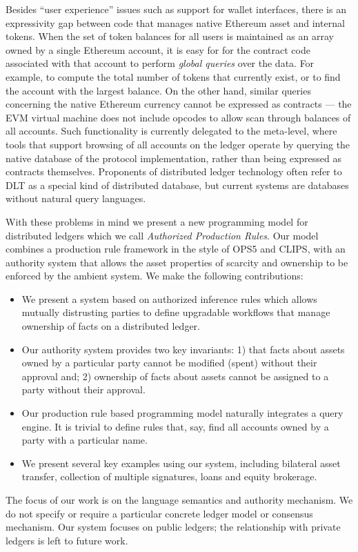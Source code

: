 Besides ``user experience'' issues such as support for wallet interfaces, there is an expressivity gap between code that manages native Ethereum asset and internal tokens. When the set of token balances for all users is maintained as an array owned by a single Ethereum account, it is easy for for the contract code associated with that account to perform \emph{global queries} over the data. For example, to compute the total number of tokens that currently exist, or to find the account with the largest balance. On the other hand, similar queries concerning the native Ethereum currency cannot be expressed as contracts --- the EVM virtual machine does not include opcodes to allow scan through balances of all accounts. Such functionality is currently delegated to the meta-level, where tools that support browsing of all accounts on the ledger operate by querying the native database of the protocol implementation, rather than being expressed as contracts themselves. Proponents of distributed ledger technology often refer to DLT as a special kind of distributed database, but current systems are databases without natural query languages.

With these problems in mind we present a new programming model for distributed ledgers which we call \emph{Authorized Production Rules}. Our model combines a production rule framework in the style of OPS5 and CLIPS, with an authority system that allows the asset properties of scarcity and ownership to be enforced by the ambient system. We make the following contributions:

\begin{itemize}
\item We present a system based on authorized inference rules which allows mutually distrusting parties to define upgradable workflows that manage ownership of facts on a distributed ledger.

\item Our authority system provides two key invariants: 1) that facts about assets owned by a particular party cannot be modified (spent) without their approval and; 2) ownership of facts about assets cannot be assigned to a party without their approval.

\item Our production rule based programming model naturally integrates a query engine. It is trivial to define rules that, say, find all accounts owned by a party with a particular name.

\item We present several key examples using our system, including bilateral asset transfer, collection of multiple signatures, loans and equity brokerage.
\end{itemize}

The focus of our work is on the language semantics and authority mechanism. We do not specify or require a particular concrete ledger model or consensus mechanism. Our system focuses on public ledgers; the relationship with private ledgers is left to future work.

